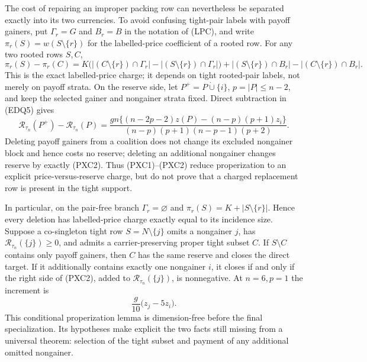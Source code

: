 \documentclass[11pt]{article}
\begin{document}
The cost of repairing an improper packing row can nevertheless be separated
exactly into its two currencies.  To avoid confusing tight-pair labels with
payoff gainers, put $\Gamma_r=G$ and $B_r=B$ in the notation of (LPC), and write
$\pi_r(S)=w(S\setminus\{r\})$ for the labelled-price coefficient of a
rooted row.  For any two rooted rows $S,C$,
\[
 \pi_r(S)-\pi_r(C)
 =K\bigl(|(C\setminus\{r\})\cap\Gamma_r|-|(S\setminus\{r\})\cap\Gamma_r|\bigr)
  +|(S\setminus\{r\})\cap B_r|-|(C\setminus\{r\})\cap B_r|. \tag{PXC1}
\]
This is the exact labelled-price charge; it depends on tight rooted-pair
labels, not merely on payoff strata.  On the reserve side, let
$P^+=P\mathbin{\dot\cup}\{i\}$, $p=|P|\le n-2$, and keep the selected gainer and
nongainer strata fixed.  Direct subtraction in (EDQ5) gives
\[
 \mathcal R_{\tau_n}(P^+)-\mathcal R_{\tau_n}(P)
 =\frac{gn\{(n-2p-2)z(P)-(n-p)(p+1)z_i\}}
 {(n-p)(p+1)(n-p-1)(p+2)}.                         \tag{PXC2}
\]
Deleting payoff gainers from a coalition does not change its excluded
nongainer block and hence costs no reserve; deleting an additional
nongainer changes reserve by exactly (PXC2).  Thus (PXC1)--(PXC2) reduce
properization to an explicit price-versus-reserve charge, but do not prove
that a charged replacement row is present in the tight support.

In particular, on the pair-free branch $\Gamma_r=\varnothing$ and
$\pi_r(S)=K+|S\setminus\{r\}|$.  Hence every deletion has labelled-price
charge exactly equal to its incidence size.  Suppose a co-singleton tight
row $S=N\setminus\{j\}$ omits a nongainer $j$, has
$\mathcal R_{\tau_n}(\{j\})\ge0$, and admits a carrier-preserving proper
tight subset $C$.  If $S\setminus C$ contains only payoff gainers, then $C$
has the same reserve and closes the direct target.  If it additionally
contains exactly one nongainer $i$, it closes if and only if the right side
of (PXC2), added to $\mathcal R_{\tau_n}(\{j\})$, is nonnegative.  At
$n=6,p=1$ the increment is
\[
 \frac{g}{10}\bigl(z_j-5z_i\bigr).                 \tag{PXC3}
\]
This conditional properization lemma is dimension-free before the final
specialization.  Its hypotheses make explicit the two facts still missing
from a universal theorem: selection of the tight subset and payment of any
additional omitted nongainer.
\end{document}
